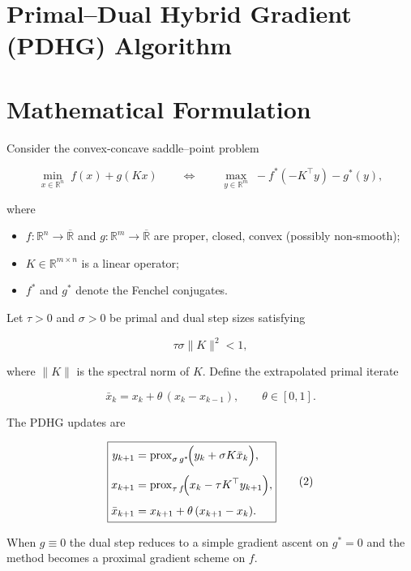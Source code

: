 \documentclass{article}
\newcommand{\prox}{\operatorname{prox}}
\begin{document}
\section*{Primal–Dual Hybrid Gradient (PDHG) Algorithm}

\section*{Mathematical Formulation}
Consider the convex‑concave saddle–point problem  

\[
\min_{x\in\mathbb R^{n}} \; f(x)+g(Kx)
\qquad\Longleftrightarrow\qquad
\max_{y\in\mathbb R^{m}} \; -f^{*}(-K^{\top}y)-g^{*}(y),
\]

where  

\begin{itemize}
\item $f:\mathbb R^{n}\to\overline{\mathbb R}$ and $g:\mathbb R^{m}\to\overline{\mathbb R}$ are proper, closed, convex (possibly non‑smooth);
\item $K\in\mathbb R^{m\times n}$ is a linear operator;
\item $f^{*}$ and $g^{*}$ denote the Fenchel conjugates.
\end{itemize}

Let $\tau>0$ and $\sigma>0$ be primal and dual step sizes satisfying  

\[
\tau\sigma\|K\|^{2}<1,
\tag{1}
\]

where $\|K\|$ is the spectral norm of $K$.  
Define the extrapolated primal iterate  

\[
\bar x_{k}=x_{k}+\theta\,(x_{k}-x_{k-1}),\qquad \theta\in[0,1].
\]

The PDHG updates are  

\[
\boxed{
\begin{aligned}
y_{k+1}&=\prox_{\sigma\,g^{*}}\!\Bigl( y_{k}+\sigma K\bar x_{k}\Bigr),\\[4pt]
x_{k+1}&=\prox_{\tau\,f}\!\Bigl( x_{k}-\tau K^{\top}y_{k+1}\Bigr),\\[4pt]
\bar x_{k+1}&=x_{k+1}+\theta\,(x_{k+1}-x_{k}).
\end{aligned}}
\tag{2}
\]

When $g\equiv 0$ the dual step reduces to a simple gradient ascent on $g^{*}=0$ and the method becomes a proximal gradient scheme on $f$.
\end{document}
